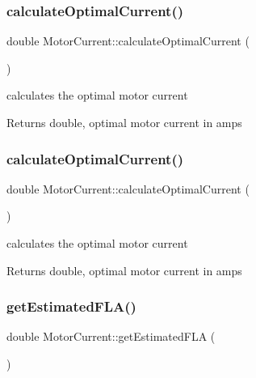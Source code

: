 \subsubsection{\texorpdfstring{calculate\+Optimal\+Current()}{calculateOptimalCurrent()}\hspace{0.1cm}{\footnotesize\ttfamily [2/3]}}
{\footnotesize\ttfamily double Motor\+Current\+::calculate\+Optimal\+Current (\begin{DoxyParamCaption}{ }\end{DoxyParamCaption})}

calculates the optimal motor current \begin{DoxyReturn}{Returns}
double, optimal motor current in amps 
\end{DoxyReturn}
\mbox{\label{class_motor_current_a40638a00e4d21b34c74f8406f4e70046}} 
\subsubsection{\texorpdfstring{calculate\+Optimal\+Current()}{calculateOptimalCurrent()}\hspace{0.1cm}{\footnotesize\ttfamily [3/3]}}
{\footnotesize\ttfamily double Motor\+Current\+::calculate\+Optimal\+Current (\begin{DoxyParamCaption}{ }\end{DoxyParamCaption})}

calculates the optimal motor current \begin{DoxyReturn}{Returns}
double, optimal motor current in amps 
\end{DoxyReturn}
\mbox{\label{class_motor_current_a0f845ec03585b21a8e476ed3e63f365f}} 
\subsubsection{\texorpdfstring{get\+Estimated\+F\+L\+A()}{getEstimatedFLA()}\hspace{0.1cm}{\footnotesize\ttfamily [1/3]}}
{\footnotesize\ttfamily double Motor\+Current\+::get\+Estimated\+F\+LA (\begin{DoxyParamCaption}{ }\end{DoxyParamCaption})\hspace{0.3cm}{\ttfamily [inline]}}

